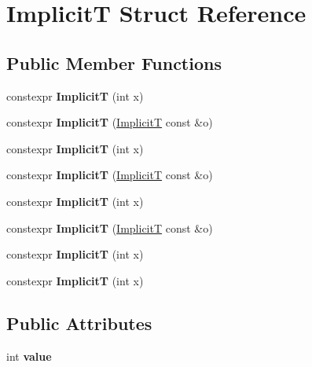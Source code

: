 \hypertarget{struct_implicit_t}{}\section{ImplicitT Struct Reference}
\label{struct_implicit_t}
\subsection*{Public Member Functions}
\begin{DoxyCompactItemize}
\item 
\mbox{\label{struct_implicit_t_a8961a71fad386073c78587166764214b}} 
constexpr {\bfseries ImplicitT} (int x)
\item 
\mbox{\label{struct_implicit_t_a754d1b84176bb4767a8edda17300723e}} 
constexpr {\bfseries ImplicitT} (\mbox{\hyperlink{struct_implicit_t}{ImplicitT}} const \&o)
\item 
\mbox{\label{struct_implicit_t_a8961a71fad386073c78587166764214b}} 
constexpr {\bfseries ImplicitT} (int x)
\item 
\mbox{\label{struct_implicit_t_a754d1b84176bb4767a8edda17300723e}} 
constexpr {\bfseries ImplicitT} (\mbox{\hyperlink{struct_implicit_t}{ImplicitT}} const \&o)
\item 
\mbox{\label{struct_implicit_t_a8961a71fad386073c78587166764214b}} 
constexpr {\bfseries ImplicitT} (int x)
\item 
\mbox{\label{struct_implicit_t_a754d1b84176bb4767a8edda17300723e}} 
constexpr {\bfseries ImplicitT} (\mbox{\hyperlink{struct_implicit_t}{ImplicitT}} const \&o)
\item 
\mbox{\label{struct_implicit_t_a8961a71fad386073c78587166764214b}} 
constexpr {\bfseries ImplicitT} (int x)
\item 
\mbox{\label{struct_implicit_t_a8961a71fad386073c78587166764214b}} 
constexpr {\bfseries ImplicitT} (int x)
\end{DoxyCompactItemize}
\subsection*{Public Attributes}
\begin{DoxyCompactItemize}
\item 
\mbox{\label{struct_implicit_t_ae180abf97141e47552557e04dfc7cdf7}} 
int {\bfseries value}
\end{DoxyCompactItemize}


